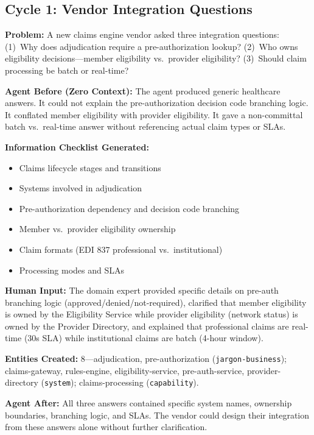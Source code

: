 \documentclass[11pt,a4paper]{article}
\begin{document}
\subsection{Cycle 1: Vendor Integration Questions}

\textbf{Problem:} A new claims engine vendor asked three integration questions: (1)~Why does adjudication require a pre-authorization lookup? (2)~Who owns eligibility decisions---member eligibility vs.\ provider eligibility? (3)~Should claim processing be batch or real-time?

\textbf{Agent Before (Zero Context):} The agent produced generic healthcare answers. It could not explain the pre-authorization decision code branching logic. It conflated member eligibility with provider eligibility. It gave a non-committal batch vs.\ real-time answer without referencing actual claim types or SLAs.

\textbf{Information Checklist Generated:}
\begin{itemize}[nosep]
  \item Claims lifecycle stages and transitions
  \item Systems involved in adjudication
  \item Pre-authorization dependency and decision code branching
  \item Member vs.\ provider eligibility ownership
  \item Claim formats (EDI 837 professional vs.\ institutional)
  \item Processing modes and SLAs
\end{itemize}

\textbf{Human Input:} The domain expert provided specific details on pre-auth branching logic (approved/denied/not-required), clarified that member eligibility is owned by the Eligibility Service while provider eligibility (network status) is owned by the Provider Directory, and explained that professional claims are real-time (30s SLA) while institutional claims are batch (4-hour window).

\textbf{Entities Created:} 8---adjudication, pre-authorization (\texttt{jargon-business}); claims-gateway, rules-engine, eligibility-service, pre-auth-service, provider-directory (\texttt{system}); claims-processing (\texttt{capability}).

\textbf{Agent After:} All three answers contained specific system names, ownership boundaries, branching logic, and SLAs. The vendor could design their integration from these answers alone without further clarification.
\end{document}
